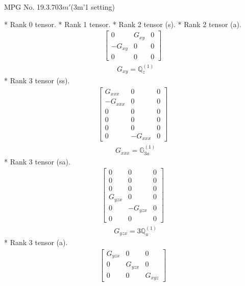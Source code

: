 \documentclass[fleqn,8pt,landscape]{jsarticle}
\begin{document}
\setcounter{MaxMatrixCols}{32}

\renewcommand{\tablename}{Table~}
\renewcommand{\figurename}{Figure~}
\begin{center}
\LARGE
MPG No. 19.3.70\quad$3m'$\quad(3m'1 setting)
\end{center}
* Rank 0 tensor.
* Rank 1 tensor.
* Rank 2 tensor (s).
* Rank 2 tensor (a).
\begin{align*}
\begin{bmatrix} 0 & G_{xy} & 0 \\ - G_{xy} & 0 & 0 \\ 0 & 0 & 0 \end{bmatrix}
\end{align*}
\begin{align*}
& G_{xy} = \mathbb{Q}_{z}^{(1)}
\end{align*}
* Rank 3 tensor (ss).
\begin{align*}
\begin{bmatrix} G_{xxx} & 0 & 0 \\ - G_{xxx} & 0 & 0 \\ 0 & 0 & 0 \\ 0 & 0 & 0 \\ 0 & 0 & 0 \\ 0 & - G_{xxx} & 0 \end{bmatrix}
\end{align*}
\begin{align*}
& G_{xxx} = \mathbb{G}_{3a}^{(1)}
\end{align*}
* Rank 3 tensor (sa).
\begin{align*}
\begin{bmatrix} 0 & 0 & 0 \\ 0 & 0 & 0 \\ 0 & 0 & 0 \\ G_{yzx} & 0 & 0 \\ 0 & - G_{yzx} & 0 \\ 0 & 0 & 0 \end{bmatrix}
\end{align*}
\begin{align*}
& G_{yzx} = 3 \mathbb{Q}_{u}^{(1)}
\end{align*}
* Rank 3 tensor (a).
\begin{align*}
\begin{bmatrix} G_{yzx} & 0 & 0 \\ 0 & G_{yzx} & 0 \\ 0 & 0 & G_{xyz} \end{bmatrix}
\end{align*}
\end{document}
